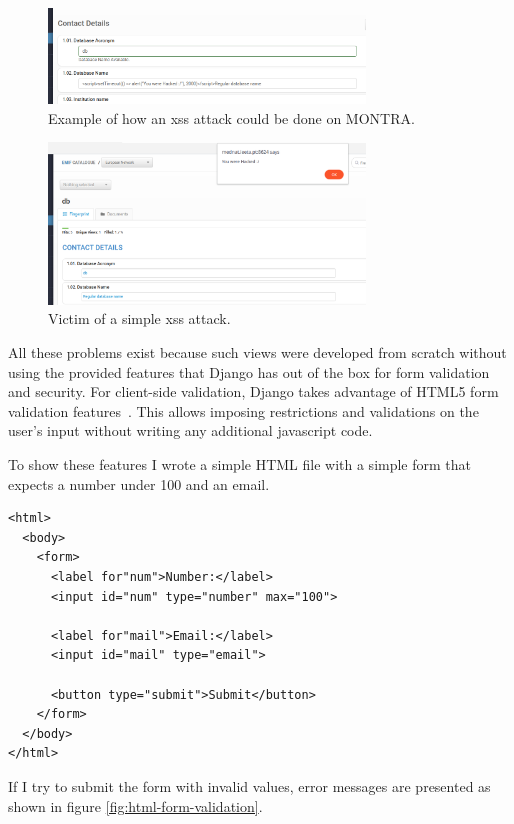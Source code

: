 \begin{figure}[H]
    \center
    \includegraphics[width=0.75\textwidth]{montra-xss-create}
    \caption{Example of how an \gls{xss} attack could be done on MONTRA.}
    \label{fig:montra-xss-create}
\end{figure}

\begin{figure}[H]
    \center
    \includegraphics[width=0.75\textwidth]{montra-xss}
    \caption{Victim of a simple \gls{xss} attack.}
    \label{fig:montra-xss}
\end{figure}

All these problems exist because such views were developed from scratch without using the provided features that Django has out of the box for form validation and security.
For client-side validation, Django takes advantage of HTML5 form validation features~\cite{form-validation}.
This allows imposing restrictions and validations on the user's input without writing any additional javascript code.

To show these features I wrote a simple HTML file with a simple form that expects a number under 100 and an email.

\begin{verbatim}
<html>
  <body>
    <form>
      <label for"num">Number:</label>
      <input id="num" type="number" max="100">

      <label for"mail">Email:</label>
      <input id="mail" type="email">

      <button type="submit">Submit</button>
    </form>
  </body>
</html>
\end{verbatim}

If I try to submit the form with invalid values, error messages are presented as shown in figure \ref{fig:html-form-validation}.


